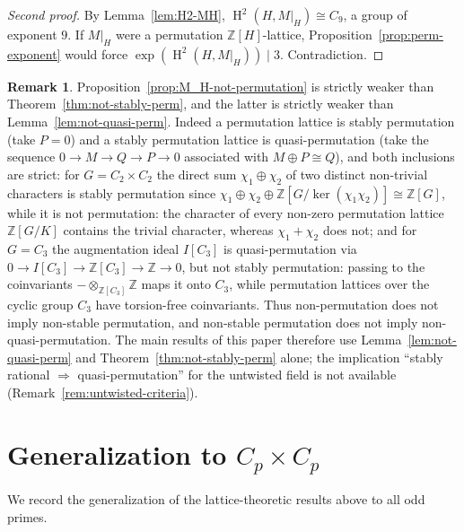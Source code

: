 \documentclass[12pt,a4paper]{article}
\theoremstyle{definition}
\newtheorem{remark}[theorem]{Remark}
\DeclareMathOperator{\coh}{H}
\begin{document}
\begin{proof}[Second proof]
By Lemma~\ref{lem:H2-MH}, \(\coh^2(H, M|_H) \cong C_9\), a group of
exponent \(9\).  If \(M|_H\) were a permutation
\(\mathbb{Z}[H]\)-lattice, Proposition~\ref{prop:perm-exponent} would
force \(\exp(\coh^2(H, M|_H)) \mid 3\).  Contradiction.
\end{proof}

\begin{remark}
Proposition~\ref{prop:M_H-not-permutation} is strictly weaker than
Theorem~\ref{thm:not-stably-perm}, and the latter is strictly weaker
than Lemma~\ref{lem:not-quasi-perm}.  Indeed a permutation lattice is
stably permutation (take \(P = 0\)) and a stably permutation lattice
is quasi-permutation (take the sequence \(0 \to M \to Q \to P \to 0\)
associated with \(M \oplus P \cong Q\)), and both inclusions are
strict: for \(G = C_2 \times C_2\) the direct sum \(\chi_1 \oplus
\chi_2\) of two distinct non-trivial characters is stably permutation
since \(\chi_1 \oplus \chi_2 \oplus \mathbb{Z}[G/\ker(\chi_1\chi_2)]
\cong \mathbb{Z}[G]\), while it is not permutation: the character of
every non-zero permutation lattice \(\mathbb{Z}[G/K]\) contains the
trivial character, whereas \(\chi_1 + \chi_2\) does not; and for
\(G = C_3\) the augmentation ideal \(I[C_3]\) is quasi-permutation
via \(0 \to I[C_3] \to \mathbb{Z}[C_3] \to \mathbb{Z} \to 0\),
but not stably permutation: passing to the coinvariants
\(-\otimes_{\mathbb{Z}[C_3]} \mathbb{Z}\) maps it onto \(C_3\),
while permutation lattices over the cyclic group \(C_3\) have
torsion-free coinvariants.  Thus non-permutation does not imply
non-stable permutation, and non-stable permutation does not imply
non-quasi-permutation.  The main results of this paper therefore use
Lemma~\ref{lem:not-quasi-perm} and Theorem~\ref{thm:not-stably-perm}
alone; the implication ``stably rational \(\Rightarrow\)
quasi-permutation'' for the untwisted field is not available
(Remark~\ref{rem:untwisted-criteria}).
\end{remark}

\section{Generalization to \(C_p \times C_p\)}
\label{sec:generalization}

We record the generalization of the lattice-theoretic results above to
all odd primes.
\end{document}
